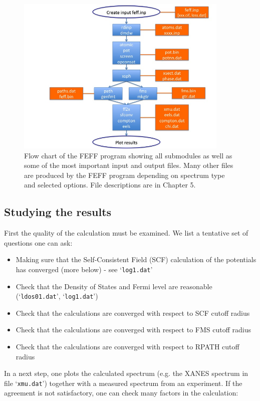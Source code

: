 \documentclass[11pt,oneside]{report} %
\newcommand{\file}[1]{`\texttt{#1}'}
\begin{document}
\begin{figure}[H]
	\centering
		\includegraphics[height=3.0in]{flow4.jpg}
		\caption{Flow chart of the FEFF program showing all submodules as well as some of the most important input and output files.  Many other files are produced by the FEFF program depending on spectrum type and selected options.  File descriptions are in Chapter 5.}   
	\label{fig:flow4}
\end{figure}


\subsection{Studying the results}

First the quality of the calculation must be examined.  We list a tentative set of questions one can ask:
\begin{itemize} \tightlist
\item Making sure that the Self-Consistent Field (SCF) calculation of the potentials has converged (more below) - see \file{log1.dat}
\item Check that the Density of States and Fermi level are reasonable (\file{ldos01.dat}, \file{log1.dat})
\item Check that the calculations are converged with respect to SCF cutoff radius
\item Check that the calculations are converged with respect to FMS cutoff radius
\item Check that the calculations are converged with respect to RPATH cutoff radius
\end{itemize}


In a next step, one plots the calculated spectrum (e.g. the XANES spectrum in file \file{xmu.dat}) together with a measured spectrum from an experiment.  If the agreement is not satisfactory, one can check many factors in the calculation:
\end{document}
